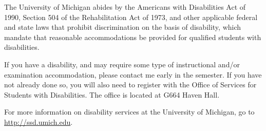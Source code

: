 \documentclass[
]{article}
\begin{document}
The University of Michigan abides by the Americans with Disabilities Act
of 1990, Section 504 of the Rehabilitation Act of 1973, and other
applicable federal and state laws that prohibit discrimination on the
basis of disability, which mandate that reasonable accommodations be
provided for qualified students with disabilities.

If you have a disability, and may require some type of instructional
and/or examination accommodation, please contact me early in the
semester. If you have not already done so, you will also need to
register with the Office of Services for Students with Disabilities. The
office is located at G664 Haven Hall.

For more information on disability services at the University of
Michigan, go to \url{http://ssd.umich.edu}.
\end{document}
